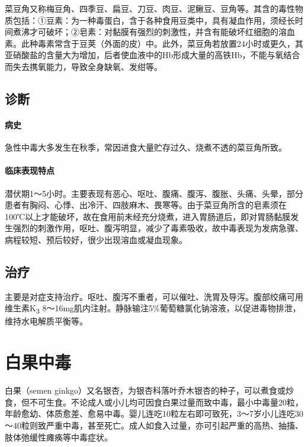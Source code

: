 菜豆角又称梅豆角、四季豆、扁豆、刀豆、肉豆、泥鳅豆、豆角等。其含的毒性物质包括：①豆素：为一种毒蛋白，含于各种食用豆类中，具有凝血作用，须经长时间煮沸才可破坏；②皂素：对黏膜有强烈的刺激性，并含有能破坏红细胞的溶血素。此种毒素常含于豆荚（外面的皮）中。此外，菜豆角若放置24小时或更久，其亚硝酸盐的含量大为增加，后者使血液中的Hb形成大量的高铁Hb，不能与氧结合而失去携氧能力，导致全身缺氧、发绀等。

\subsection{诊断}

\paragraph{病史}

急性中毒大多发生在秋季，常因进食大量贮存过久、烧煮不透的菜豆角所致。

\paragraph{临床表现特点}

潜伏期1～5小时。主要表现有恶心、呕吐、腹痛、腹泻、腹胀、头痛、头晕，部分患者有胸闷、心悸、出冷汗、四肢麻木、畏寒等。由于菜豆角所含的皂素须在100℃以上才能破坏，故在食用前未经充分烧煮，进入胃肠道后，即对胃肠黏膜发生强烈的刺激作用，呕吐、腹泻明显，减少了毒素吸收，故中毒表现为发病急骤、病程较短、预后较好，很少出现溶血或凝血现象。

\subsection{治疗}

主要是对症支持治疗。呕吐、腹泻不重者，可以催吐、洗胃及导泻。腹部绞痛可用维生素K\textsubscript{3}
8～16mg肌内注射。静脉输注5\%葡萄糖氯化钠溶液，以促进毒物排泄，维持水电解质平衡等。

\protect\hypertarget{text00168.html}{}{}

\section{白果中毒}

白果（semen
ginkgo）又名银杏，为银杏科落叶乔木银杏的种子，可以煮食或炒食，但不可生食。不论成人或小儿均可因食白果过量而致中毒，最小中毒量20粒，年龄愈幼、体质愈差、愈易中毒。婴儿连吃10粒左右即可致死，3～7岁小儿连吃30～40粒则致严重中毒，甚至死亡。成人如食入过量，亦可引起严重的高热、抽搐、肢体弛缓性瘫痪等中毒症状。

